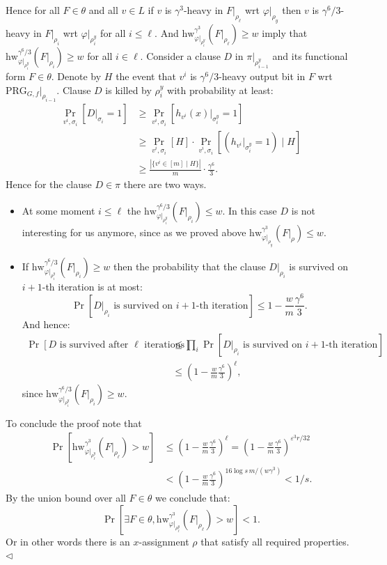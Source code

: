 \documentclass[10pt,a4paper]{article}
\begin{document}
Hence for all $F\in\theta$ and all $v\in L$ if $v$ is $\gamma^3$-heavy in $F|_{\rho_\ell}$ wrt $\varphi|_{\rho_y}$ then $v$ is $\gamma^6/3$-heavy in $F|_{\rho_i}$ wrt $\varphi|_{\rho_i^y}$ for all $i\leq\ell$. And $\mathrm{hw}_{\varphi|_{\rho_i^y}}^{\gamma^3}(F|_{\rho_\ell})\geq w$ imply that $\mathrm{hw}_{\varphi|_{\rho_i^y}}^{\gamma^6/3}(F|_{\rho_i})\geq w$ for all $i\in\ell$.
Consider a clause $D$ in $\pi|_{\rho_{i-1}^y}$ and its functional form $F\in\theta$. Denote by $H$ the event that $v^i$ is $\gamma^6/3$-heavy output bit in $F$ wrt $\mathrm{PRG}_{G,f}|_{\rho_{i-1}}$. Clause $D$ is killed by $\rho_i^y$ with probability at least:
\begin{align*}
\Pr_{v^i,\sigma_i}[D|_{\sigma_i}=1]&\geq\Pr_{v^i,\sigma_i}[h_{v^i}(x)|_{\sigma_i^y}=1]\\
&\geq\Pr_{v^i,\sigma_i}[H]\cdot\Pr_{v^i,\sigma_i}[(h_{v^i}|_{\sigma_i^y}=1)\mid H]\\
&\geq\frac{|\{v^i\in[m]\mid H\}|}{m}\cdot\frac{\gamma^6}3.
\end{align*}
Hence for the clause $D\in\pi$ there are two ways.
\begin{itemize}
\item At some moment $i\leq\ell$ the $\mathrm{hw}_{\varphi|_{\rho_i^y}}^{\gamma^6/3}(F|_{\rho_i})\leq w$. In this case $D$ is not interesting for us anymore, since as we proved above $\mathrm{hw}_{\varphi|_{\rho_y}}^{\gamma^3}(F|_\rho)\leq w$.
\item If $\mathrm{hw}_{\varphi|_{\rho_i^y}}^{\gamma^6/3}(F|_{\rho_i})\geq w$ then the probability that the clause $D|_{\rho_i}$ is survived on $i+1$-th iteration is at most:
\[\Pr[D|_{\rho_i}\text{ is survived on }i+1\text{-th iteration}]\leq1-\frac wm\frac{\gamma^6}3.\]
And hence:
\begin{align*}
\Pr[D\text{ is survived after }\ell\text{ iterations}]&\leq\prod_i\Pr[D|_{\rho_i}\text{ is survived on }i+1\text{-th iteration}]\\
&\leq\left(1-\frac wm\frac{\gamma^6}3\right)^\ell,
\end{align*}
since $\mathrm{hw}_{\varphi|_{\rho_i^y}}^{\gamma^6/3}(F|_{\rho_i})\geq w$.
\end{itemize}
To conclude the proof note that
\begin{align*}
\Pr[\mathrm{hw}_{\varphi|_{\rho_\ell^y}}^{\gamma^3}(F|_{\rho_\ell})>w]
&\leq\left(1-\frac wm\frac{\gamma^6}3\right)^\ell=\left(1-\frac wm\frac{\gamma^6}3\right)^{\varepsilon^3r/32}\\
&<\left(1-\frac wm\frac{\gamma^6}3\right)^{16\log s\,m/(w\gamma^3)}<1/s.
\end{align*}
By the union bound over all $F\in\theta$ we conclude that:
\[\Pr[\exists F\in\theta,\mathrm{hw}_{\varphi|_{\rho_\ell^y}}^{\gamma^3}(F|_{\rho_\ell})>w]<1.\]
Or in other words there is an $x$-assignment $\rho$ that satisfy all required properties.\hfill$\triangleleft$
\end{document}
